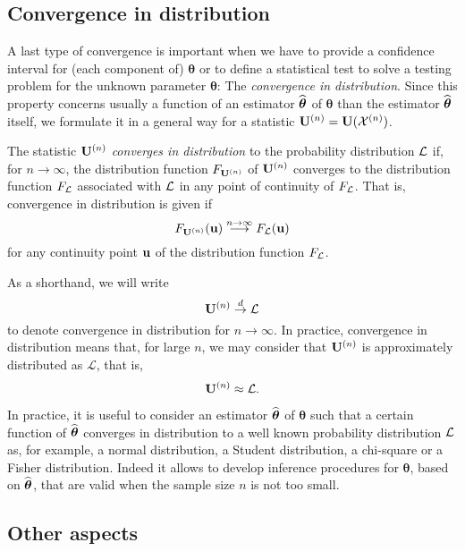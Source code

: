 \subsection{Convergence in distribution}

A last type of convergence is important when we have to provide a confidence
interval for (each component of) $\boldsymbol\theta$ or to define a statistical
test to solve a testing problem for the unknown parameter $\boldsymbol\theta$:
The \emph{convergence in distribution}. Since this property concerns usually a
function of an estimator $\widehat{\boldsymbol\theta}$ of $\boldsymbol\theta$
than the estimator $\widehat{\boldsymbol\theta}$ itself, we formulate it in a
general way for a statistic $\mathbf U^{(n)}=\mathbf U({\cal X}^{(n)})$.

The statistic $\mathbf U^{(n)}$ \emph{converges in distribution} to the
probability distribution ${\cal L}$ if, for $n \rightarrow \infty$, the
distribution function $F_{\mathbf U^{(n)}}$ of $\mathbf U^{(n)}$ converges to
the distribution function $F_{\cal L}$ associated with ${\cal L}$ in any point
of continuity of $F_{\cal L}$. That is, convergence in distribution is given if
\[
    F_{\mathbf U^{(n)}}(\mathbf u) \stackrel{n \rightarrow \infty}{\longrightarrow} F_{\cal L}(\mathbf u)
\] 
for any continuity point $\mathbf u$ of the distribution function $F_{\cal L}$.

As a shorthand, we will write
\[
    \mathbf U^{(n)} \stackrel{d}{\rightarrow} \mathcal{L}
\]
to denote convergence in distribution for $n \rightarrow \infty$. In practice, 
convergence in distribution means that, for large $n$, we may consider that
$\mathbf U^{(n)}$ is approximately distributed as $\mathcal{L}$, that is,
\[
    \mathbf U^{(n)} \approx \mathcal{L}.
\]

In practice, it is useful to consider an estimator $\widehat{\boldsymbol\theta}$
of $\boldsymbol\theta$ such that a certain function of
$\widehat{\boldsymbol\theta}$ converges in distribution to a well known
probability distribution ${\cal L}$ as, for example, a normal distribution, a
Student distribution, a chi-square or a Fisher distribution. Indeed it allows
to develop inference procedures for $\boldsymbol\theta$, based on
$\widehat{\boldsymbol\theta}$, that are valid when the sample size $n$ is not too
small.

\subsection{Other aspects}


